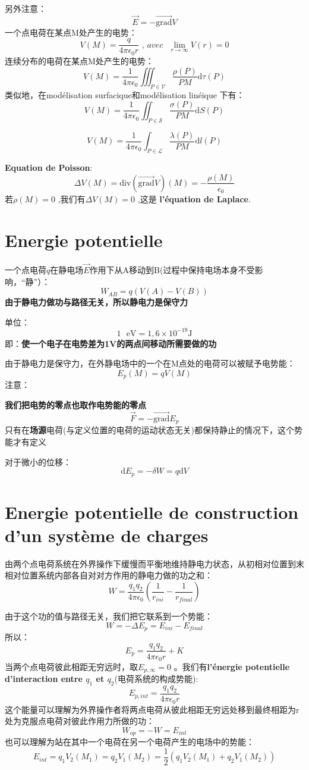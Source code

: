 \documentclass[12pt]{book}
\theoremstyle{definition}\newtheorem{dfn}{Définition}[chapter]
\theoremstyle{plain}\newtheorem{thm}{Théorème}[chapter]
\theoremstyle{plain}\newtheorem{prp}{Proposition}[chapter]
\theoremstyle{plain}\newtheorem{lem}{\bf Lemme}[chapter]
\theoremstyle{plain}\newtheorem{axm}{\bf Axiome}[chapter]
\theoremstyle{plain}\newtheorem{lmm}{\bf Lemme}[chapter]
\theoremstyle{plain}\newtheorem{cor}{\bf Corollaire}[chapter]
\theoremstyle{remark}\newtheorem{rem}{Remarque}[chapter]
\begin{document}
另外注意：
$$
\boxed{\overrightarrow{E}=-\overrightarrow{\mathrm{grad}}V}
$$
一个点电荷在某点M处产生的电势：
$$
\boxed{V(M)=\frac{q}{4\pi\epsilon_{0}r}\text{ , } avec  \text{ } \lim\limits_{r\rightarrow\infty} V(r)=0}
$$
连续分布的电荷在某点M处产生的电势：
$$
\boxed{V(M)=\frac{1}{4\pi\epsilon_{0}}\iiint_{P\in\mathcal{V}}\frac{\rho(P)}{PM}\mathrm{d}\tau(P)}
$$
类似地，在modélisation surfacique和modélisation linéique 下有：
$$
\boxed{V(M)=\frac{1}{4\pi\epsilon_{0}}\iint_{P\in\mathcal{S}}\frac{\sigma(P)}{PM}\mathrm{d}S(P)}
$$

$$
\boxed{V(M)=\frac{1}{4\pi\epsilon_{0}}\int_{P\in\mathcal{\mathcal{L}}}\frac{\lambda(P)}{PM}\mathrm{d}l(P)}
$$

{\bf Equation de Poisson}:
$$
\boxed{\Delta V(M)=\text{div}(\overrightarrow{\mathrm{grad}}V)(M)=-\frac{\rho(M)}{\epsilon_0}}
$$
若$\rho(M)=0$ ,我们有$\boxed{\Delta V(M)=0}$ ,这是 {\bf l'équation de Laplace}.

\section{Energie potentielle}

一个点电荷$q$在静电场$\overrightarrow{E}$作用下从A移动到B(过程中保持电场本身不受影响，“静”）：
$$
\boxed{W_{AB}=q(V(A)-V(B))}
$$
{\bf 由于静电力做功与路径无关，所以静电力是保守力}

单位：
$$
\boxed{1\text{ }\mathrm{eV}=1,6\times10^{-19}\mathrm{J}}
$$
即：{\bf 使一个电子在电势差为1V的两点间移动所需要做的功}

由于静电力是保守力，在外静电场中的一个在M点处的电荷可以被赋予电势能：
$$
\boxed{E_p(M)=qV(M)}
$$
注意：

{\bf 我们把电势的零点也取作电势能的零点}
$$
\boxed{\overrightarrow{F}=-\overrightarrow{\mathrm{grad}}E_p}
$$
只有在{\bf 场源}电荷(与定义位置的电荷的运动状态无关)都保持静止的情况下，这个势能才有定义

对于微小的位移：
$$
\boxed{\mathrm{d}E_{p}=-\delta W=q\mathrm{d}V}
$$

\section{ Energie potentielle  de construction d'un système de charges}
由两个点电荷系统在外界操作下缓慢而平衡地维持静电力状态，从初相对位置到末相对位置系统内部各自对对方作用的静电力做的功之和：
$$
\boxed{W=\frac{q_{1}q_{2}}{4\pi\epsilon_{0}}\left(\frac{1}{r_{ini}}-\frac{1}{r_{final}}\right)}
$$


由于这个功的值与路径无关，我们把它联系到一个势能：
$$
W=-\Delta E_p=E_{ini}-E_{final}
$$
所以：
$$
E_p=\frac{q_{1}q_{2}}{4\pi\epsilon_{0}r}+K
$$
当两个点电荷彼此相距无穷远时，取$E_{p,\infty}=0$ 。我们有{\bf l'énergie potentielle d'interaction entre $q_1$ et $q_2$}(电荷系统的构成势能):
$$
\boxed{E_{p,int}=\frac{q_{1}q_{2}}{4\pi\epsilon_{0}r}}
$$
这个能量可以理解为外界操作者将两点电荷从彼此相距无穷远处移到最终相距为r处为克服点电荷对彼此作用力所做的功：
$$
\boxed{W_{op}=-W=E_{int}}
$$
也可以理解为站在其中一个电荷在另一个电荷产生的电场中的势能：
$$
\boxed{E_{int}=q_{1}V_{2}(M_1)=q_{2}V_{1}(M_2)=\frac{1}{2}\left(q_{1}V_{2}(M_1)+q_{2}V_{1}(M_2)\right)}
$$
\end{document}
